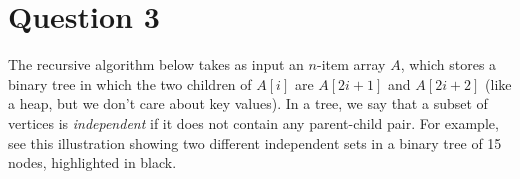 
\section*{Question 3}

The recursive algorithm below takes as input an $n$-item array $A$, which stores a binary tree in which the two children of $A[i]$ are $A[2i+1]$ and $A[2i+2]$ (like a heap, but we don't care about key values).
In a tree, we say that a subset of vertices is \textit{independent} if it does not contain any parent-child pair.
For example, see this illustration showing two different independent sets in a binary tree of 15 nodes, highlighted in black.

